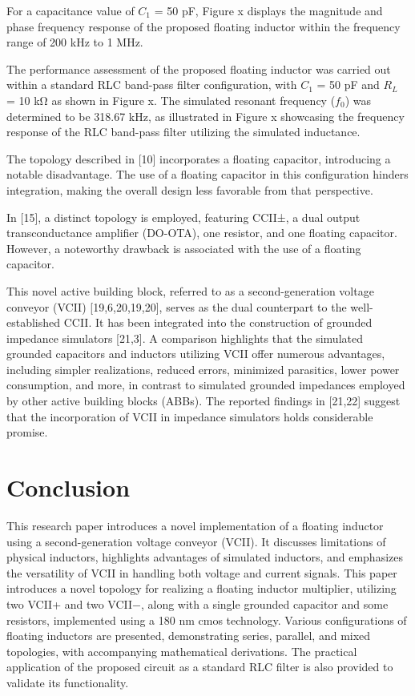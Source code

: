 \documentclass{./styles/svproc}
\begin{document}
For a capacitance value of $C_{1}$ = 50 pF, Figure x displays the magnitude and phase frequency response of the proposed floating inductor within the frequency range of 200 kHz to 1 MHz.

The performance assessment of the proposed floating inductor was carried out within a standard RLC band-pass filter configuration, with $C_{1}$ = 50 pF and $R_{L}$ = 10 k$\si{\ohm}$ as shown in Figure x. The simulated resonant frequency ($f_{0}$) was determined to be 318.67 kHz, as illustrated in Figure x showcasing the frequency response of the RLC band-pass filter utilizing the simulated inductance.


The topology described in [10] incorporates a floating capacitor, introducing a notable disadvantage. The use of a floating capacitor in this configuration hinders integration, making the overall design less favorable from that perspective.

In [15], a distinct topology is employed, featuring CCII±, a dual output transconductance amplifier (DO-OTA), one resistor, and one floating capacitor. However, a noteworthy drawback is associated with the use of a floating capacitor.

This novel active building block, referred to as a second-generation voltage conveyor (VCII) [19,6,20,19,20], serves as the dual counterpart to the well-established CCII. It has been integrated into the construction of grounded impedance simulators [21,3]. A comparison highlights that the simulated grounded capacitors and inductors utilizing VCII offer numerous advantages, including simpler realizations, reduced errors, minimized parasitics, lower power consumption, and more, in contrast to simulated grounded impedances employed by other active building blocks (ABBs). The reported findings in [21,22] suggest that the incorporation of VCII in impedance simulators holds considerable promise.

\section{Conclusion}
This research paper introduces a novel implementation of a floating inductor using a second-generation voltage conveyor (VCII). It discusses limitations of physical inductors, highlights advantages of simulated inductors, and emphasizes the versatility of VCII in handling both voltage and current signals. This paper introduces a novel topology for realizing a floating inductor multiplier, utilizing two VCII+ and two VCII−, along with a single grounded capacitor and some resistors,  implemented using a 180 nm cmos technology. Various configurations of floating inductors are presented, demonstrating series, parallel, and mixed topologies, with accompanying mathematical derivations. The practical application of the proposed circuit as a standard RLC filter is also provided to validate its functionality.
\end{document}
